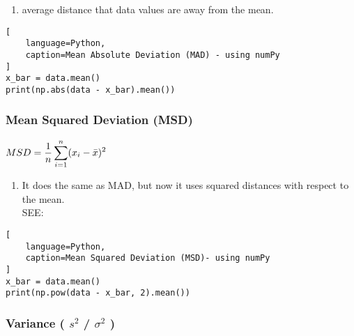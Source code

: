 \vspace{0.2cm}

\begin{enumerate}
    \item average distance that data values are away from the mean. \hfill \cite{statistics/book/Statistics-for-Data-Scientists/Maurits-Kaptein}
\end{enumerate}

\begin{lstlisting}[
    language=Python,
    caption=Mean Absolute Deviation (MAD) - using numPy
]
x_bar = data.mean()
print(np.abs(data - x_bar).mean())
\end{lstlisting}



\subsubsection{Mean Squared Deviation (MSD) \cite{statistics/book/Statistics-for-Data-Scientists/Maurits-Kaptein}} \label{Data/Describing Data/Central Tendency/Mean Squared Deviation (MSD)}

$
    MSD
    = \dfrac{1}{n} \displaystyle\sum_{i=1}^{n} (x_i - \bar{x})^2
$ \hfill \cite{statistics/book/Statistics-for-Data-Scientists/Maurits-Kaptein}

\begin{enumerate}
    \item It does the same as MAD, but now it uses squared distances with respect to the mean.  \hfill \cite{statistics/book/Statistics-for-Data-Scientists/Maurits-Kaptein}\\
    SEE: 

\end{enumerate}


\begin{lstlisting}[
    language=Python,
    caption=Mean Squared Deviation (MSD)- using numPy
]
x_bar = data.mean()
print(np.pow(data - x_bar, 2).mean())
\end{lstlisting}


\subsubsection{Variance ( $s^2$ / $\sigma^2$ ) \cite{statistics/book/Statistics-for-Data-Scientists/Maurits-Kaptein}} \label{Data/Describing Data/Central Tendency/Variance}

